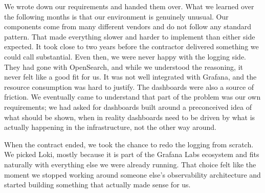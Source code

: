 We wrote down our requirements and handed them over. What we learned over the following months is
that our environment is genuinely unusual. Our components come from many different vendors and do
not follow any standard pattern. That made everything slower and harder to implement than either
side expected. It took close to two years before the contractor delivered something we could call
substantial. Even then, we were never happy with the logging side. They had gone with OpenSearch,
and while we understood the reasoning, it never felt like a good fit for us. It was not well
integrated with Grafana, and the resource consumption was hard to justify. The dashboards were also
a source of friction. We eventually came to understand that part of the problem was our own
requirements; we had asked for dashboards built around a preconceived idea of what should be shown,
when in reality dashboards need to be driven by what is actually happening in the infrastructure,
not the other way around.

When the contract ended, we took the chance to redo the logging from scratch. We picked Loki,
mostly because it is part of the Grafana Labs ecosystem and fits naturally with everything else we
were already running. That choice felt like the moment we stopped working around someone else's
observability architecture and started building something that actually made sense for us.